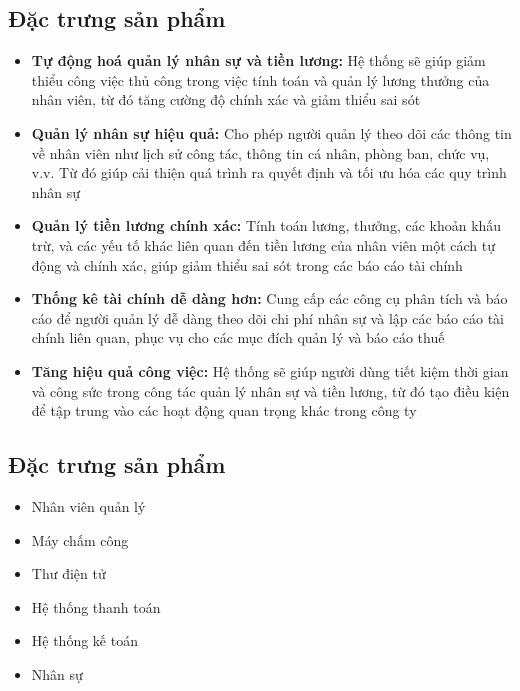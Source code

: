 \subsection{Đặc trưng sản phẩm}
\begin{itemize}
\item \textbf{Tự động hoá quản lý nhân sự và tiền lương:} Hệ thống sẽ giúp giảm thiểu công việc thủ công trong việc tính toán và quản lý lương thưởng của nhân viên, từ đó tăng cường độ chính xác và giảm thiểu sai sót
\item \textbf{Quản lý nhân sự hiệu quả:} Cho phép người quản lý theo dõi các thông tin về nhân viên như lịch sử công tác, thông tin cá nhân, phòng ban, chức vụ, v.v. Từ đó giúp cải thiện quá trình ra quyết định và tối ưu hóa các quy trình nhân sự
\item \textbf{Quản lý tiền lương chính xác:} Tính toán lương, thưởng, các khoản khấu trừ, và các yếu tố khác liên quan đến tiền lương của nhân viên một cách tự động và chính xác, giúp giảm thiểu sai sót trong các báo cáo tài chính
\item \textbf{Thống kê tài chính dễ dàng hơn:} Cung cấp các công cụ phân tích và báo cáo để người quản lý dễ dàng theo dõi chi phí nhân sự và lập các báo cáo tài chính liên quan, phục vụ cho các mục đích quản lý và báo cáo thuế
\item \textbf{Tăng hiệu quả công việc:} Hệ thống sẽ giúp người dùng tiết kiệm thời gian và công sức trong công tác quản lý nhân sự và tiền lương, từ đó tạo điều kiện để tập trung vào các hoạt động quan trọng khác trong công ty
\end{itemize}
\subsection{Đặc trưng sản phẩm}
\begin{itemize}
    \item Nhân viên quản lý 
    \item Máy chấm công
    \item Thư điện tử
    \item Hệ thống thanh toán 
    \item Hệ thống kế toán
    \item Nhân sự
\end{itemize}
